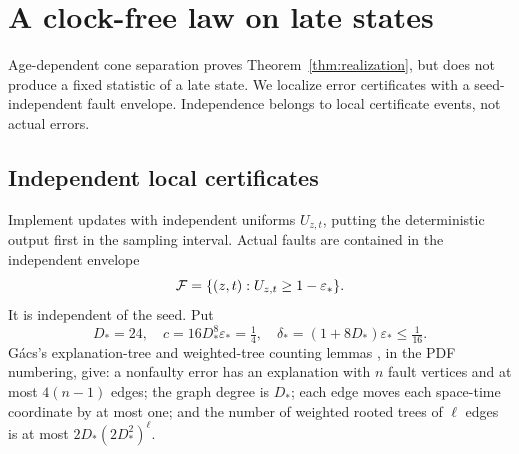 \section{A clock-free law on late states}\label{sec:clockfree}
Age-dependent cone separation proves Theorem~\ref{thm:realization},
but does not produce a fixed statistic of a late state. We localize
error certificates with a seed-independent fault envelope.
Independence belongs to local certificate events, not actual errors.

\subsection{Independent local certificates}
Implement updates with independent uniforms $U_{z,t}$, putting the
deterministic output first in the sampling interval. Actual faults
are contained in the independent envelope
\[
 {\cal F}=\{(z,t):U_{z,t}\geq1-\varepsilon_*\}.
\]
It is independent of the seed. Put
\[
 D_*=24,\quad c=16D_*^8\varepsilon_*=\tfrac14,\quad
 \delta_*=(1+8D_*)\varepsilon_*\leq\tfrac1{16}.
\]
G\'acs's explanation-tree and weighted-tree counting lemmas
\cite[Lemmas~2.3 and 2.6]{gacstoom}, in the PDF numbering, give:
a nonfaulty error has an explanation with $n$ fault vertices and
at most $4(n-1)$ edges; the graph degree is $D_*$; each edge moves
each space-time coordinate by at most one; and the number of
weighted rooted trees of $\ell$ edges is at most
$2D_*(2D_*^2)^\ell$.

